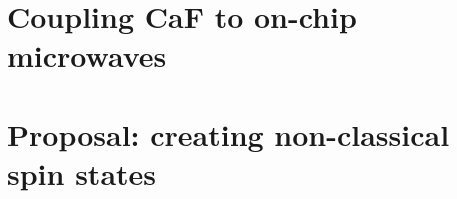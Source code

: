 \documentclass[a4paper, 12pt, twoside]{report}
\newcommand{\CaF}{CaF}
\begin{document}
\chapter{Coupling \CaF{} to on-chip microwaves}
\label{mws}


\chapter{Proposal: creating non-classical spin states}
\label{squeeze}


%

\clearpage

\printbibliography
\end{document}
